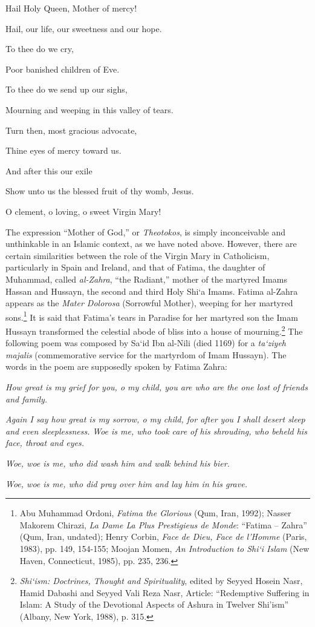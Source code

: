 \begin{quotex}
Hail Holy Queen, Mother of mercy!

Hail, our life, our sweetness and our hope.

To thee do we cry,

Poor banished children of Eve.

To thee do we send up our sighs,

Mourning and weeping in this valley of tears.

Turn then, most gracious advocate,

Thine eyes of mercy toward us.

And after this our exile

Show unto us the blessed fruit of thy womb, Jesus.

O clement, o loving, o sweet Virgin Mary!
\end{quotex}


The expression ``Mother of God,'' or \emph{Theotokos}, is simply inconceivable and unthinkable in an Islamic context, as we have noted above. However, there are certain similarities between the role of the Virgin Mary in Catholicism, particularly in Spain and Ireland, and that of Fatima, the daughter of Muhammad, called \emph{al-Zahra}, ``the Radiant,'' mother of the martyred Imams Hassan and Hussayn, the second and third Holy Shi`a Imams. Fatima al-Zahra appears as the \emph{Mater Dolorosa} (Sorrowful Mother), weeping for her martyred sons.\footnote{Abu Muhammad Ordoni, \emph{Fatima the Glorious} (Qum, Iran, 1992); Nasser Makorem Chirazi, \emph{La Dame La Plus Prestigieus de Monde}: ``Fatima -- Zahra'' (Qum, Iran, undated); Henry Corbin, \emph{Face de Dieu, Face de l'Homme} (Paris, 1983), pp. 149, 154-155; Moojan Momen, \emph{An Introduction to Shi`i Islam} (New Haven, Connecticut, 1985), pp. 235, 236.} It is said that Fatima's tears in Paradise for her martyred son the Imam Hussayn transformed the celestial abode of bliss into a house of mourning.\footnote{\emph{Shi`ism: Doctrines, Thought and Spirituality}, edited by Seyyed Hosein Nasr, Hamid Dabashi and Seyyed Vali Reza Nasr, Article: ``Redemptive Suffering in Islam: A Study of the Devotional Aspects of Ashura in Twelver Shi'ism'' (Albany, New York, 1988), p. 315.} The following poem was composed by Sa`id Ibn al-Nili (died 1169) for a \emph{ta`ziyeh majalis} (commemorative service for the martyrdom of Imam Hussayn). The words in the poem are supposedly spoken by Fatima Zahra:

\begin{quotex}
\emph{How great is my grief for you, o my child, you are who are the one lost of friends and family.}

\emph{Again I say how great is my sorrow, o my child, for after you I shall desert sleep and even sleeplessness.}
\emph{Woe is me, who took care of his shrouding, who beheld his face, throat and eyes.}

\emph{Woe, woe is me, who did wash him and walk behind his bier.}

\emph{Woe, woe is me, who did pray over him and lay him in his grave.}
\end{quotex}


